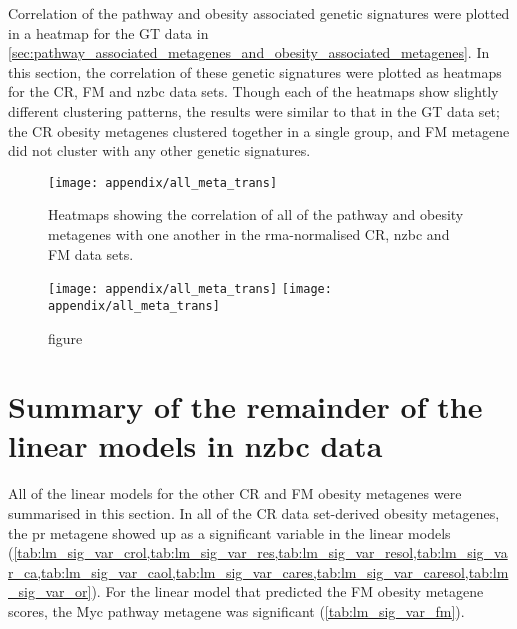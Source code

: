 	Correlation of the pathway and obesity associated genetic signatures were plotted in a heatmap for the GT data in \cref{sec:pathway_associated_metagenes_and_obesity_associated_metagenes}.
	In this section, the correlation of these genetic signatures were plotted as heatmaps for the CR, FM and \gls{nzbc} data sets.
	Though each of the heatmaps show slightly different clustering patterns, the results were similar to that in the GT data set; the CR obesity metagenes clustered together in a single group, and FM metagene did not cluster with any other genetic signatures.

	\begin{figure}[htp!]
		\centering
		\texttt{[image: appendix/all\_meta\_trans]}
		\caption[Heatmaps of the Pearson correlation of all the obesity and the pathway metagenes with one another in the \gls{rma}-normalised CR, \gls{nzbc} and FM data]{Heatmaps showing the correlation of all of the pathway and obesity metagenes with one another in the \gls{rma}-normalised CR, \gls{nzbc} and FM data sets.
		}
		\label{fig:appendix/all_meta_other_data}
	\end{figure}

	\begin{figure}[htpb]
		\ContinuedFloat
		\captionsetup{list=off,format=cont}
		\centering
		\texttt{[image: appendix/all\_meta\_trans]}
		\texttt{[image: appendix/all\_meta\_trans]}
		\caption[]{figure}
	\end{figure}

	\newpage

	\section{Summary of the remainder of the linear models in \gls{nzbc} data}
	\label{sec:summary_of_the_linear_models_in_nzbc_data}

	All of the linear models for the other CR and FM obesity metagenes were summarised in this section.
	In all of the CR data set-derived obesity metagenes, the \gls{pr} metagene showed up as a significant variable in the linear models (\cref{tab:lm_sig_var_crol,tab:lm_sig_var_res,tab:lm_sig_var_resol,tab:lm_sig_var_ca,tab:lm_sig_var_caol,tab:lm_sig_var_cares,tab:lm_sig_var_caresol,tab:lm_sig_var_or}).
	For the linear model that predicted the FM obesity metagene scores, the Myc pathway metagene was significant (\cref{tab:lm_sig_var_fm}).

